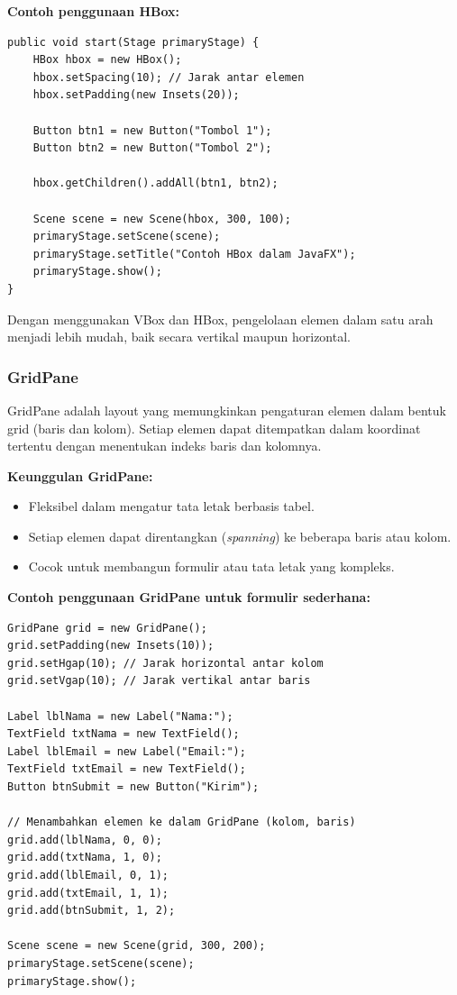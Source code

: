 \textbf{Contoh penggunaan HBox:}
\begin{lstlisting}[style=JavaStyle, caption=Menyusun elemen dalam HBox]
public void start(Stage primaryStage) {
	HBox hbox = new HBox();
	hbox.setSpacing(10); // Jarak antar elemen
	hbox.setPadding(new Insets(20));
	
	Button btn1 = new Button("Tombol 1");
	Button btn2 = new Button("Tombol 2");
	
	hbox.getChildren().addAll(btn1, btn2);
	
	Scene scene = new Scene(hbox, 300, 100);
	primaryStage.setScene(scene);
	primaryStage.setTitle("Contoh HBox dalam JavaFX");
	primaryStage.show();
}
\end{lstlisting}

Dengan menggunakan VBox dan HBox, pengelolaan elemen dalam satu arah menjadi lebih mudah, baik secara vertikal maupun horizontal.

\subsubsection{GridPane}

GridPane adalah layout yang memungkinkan pengaturan elemen dalam bentuk grid (baris dan kolom). Setiap elemen dapat ditempatkan dalam koordinat tertentu dengan menentukan indeks baris dan kolomnya.

\textbf{Keunggulan GridPane:}
\begin{itemize}
\item Fleksibel dalam mengatur tata letak berbasis tabel.
\item Setiap elemen dapat direntangkan (\textit{spanning}) ke beberapa baris atau kolom.
\item Cocok untuk membangun formulir atau tata letak yang kompleks.
\end{itemize}

\textbf{Contoh penggunaan GridPane untuk formulir sederhana:}
\begin{lstlisting}[style=JavaStyle, caption=Membuat formulir menggunakan GridPane]
GridPane grid = new GridPane();
grid.setPadding(new Insets(10));
grid.setHgap(10); // Jarak horizontal antar kolom
grid.setVgap(10); // Jarak vertikal antar baris

Label lblNama = new Label("Nama:");
TextField txtNama = new TextField();
Label lblEmail = new Label("Email:");
TextField txtEmail = new TextField();
Button btnSubmit = new Button("Kirim");

// Menambahkan elemen ke dalam GridPane (kolom, baris)
grid.add(lblNama, 0, 0);
grid.add(txtNama, 1, 0);
grid.add(lblEmail, 0, 1);
grid.add(txtEmail, 1, 1);
grid.add(btnSubmit, 1, 2);

Scene scene = new Scene(grid, 300, 200);
primaryStage.setScene(scene);
primaryStage.show();
\end{lstlisting}

